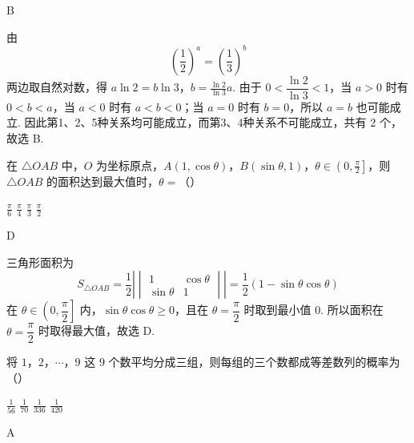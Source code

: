 \begin{answer}B\end{answer}

\begin{solution}
由
\[
\left(\frac12\right)^a=\left(\frac13\right)^b
\]
两边取自然对数，得
\(a\ln2=b\ln3\)，\(b=\frac{\ln2}{\ln3}a\).
由于 \(0<\dfrac{\ln2}{\ln3}<1\)，当 \(a>0\) 时有 \(0<b<a\)，当 \(a<0\) 时有 \(a<b<0\)；当 \(a=0\) 时有 \(b=0\)，所以 \(a=b\) 也可能成立. 因此第1、2、5种关系均可能成立，而第3、4种关系不可能成立，共有 \(2\) 个，故选 B.
\end{solution}

\begin{problem}
在 \(\triangle OAB\) 中，\(O\) 为坐标原点，\(A(1,\cos\theta)\)，\(B(\sin\theta,1)\)，\(\theta\in\left(0,\frac{\pi}{2}\right]\)，则 \(\triangle OAB\) 的面积达到最大值时，\(\theta=\)（\quad）

\choices
    {\(\frac{\pi}{6}\)}
    {\(\frac{\pi}{4}\)}
    {\(\frac{\pi}{3}\)}
    {\(\frac{\pi}{2}\)}
\end{problem}

\begin{answer}D\end{answer}

\begin{solution}
三角形面积为
\[
S_{\triangle OAB}=\frac12\left|\begin{vmatrix}1&\cos\theta\\ \sin\theta&1\end{vmatrix}\right|
=\frac12\left(1-\sin\theta\cos\theta\right)
\]
在 \(\theta\in\left(0,\dfrac{\pi}{2}\right]\) 内，\(\sin\theta\cos\theta\geqslant0\)，且在 \(\theta=\dfrac{\pi}{2}\) 时取到最小值 \(0\). 所以面积在 \(\theta=\dfrac{\pi}{2}\) 时取得最大值，故选 D.
\end{solution}

\begin{problem}
将 \(1\)，\(2\)，\(\cdots\)，\(9\) 这 \(9\) 个数平均分成三组，则每组的三个数都成等差数列的概率为（\quad）

\choices
    {\(\frac{1}{56}\)}
    {\(\frac{1}{70}\)}
    {\(\frac{1}{336}\)}
    {\(\frac{1}{420}\)}
\end{problem}

\begin{answer}A\end{answer}

